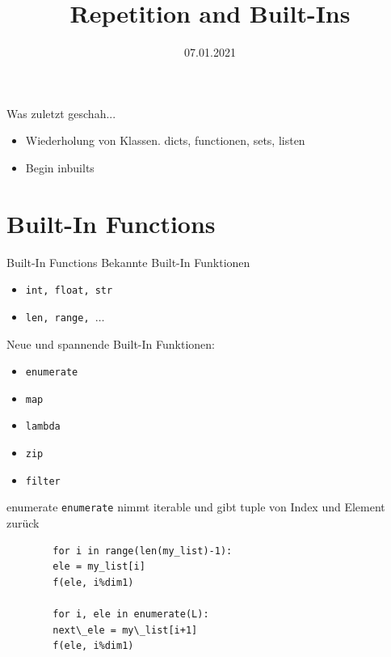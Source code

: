 



\title{Repetition and Built-Ins}
\date{07.01.2021}


	
\maketitle

\begin{frame}{Was zuletzt geschah...}
	\begin{itemize}
		\item Wiederholung von Klassen. dicts, functionen, sets, listen
		\item Begin inbuilts
	\end{itemize}
\end{frame}

\section{Built-In Functions}
\begin{frame}{Built-In Functions}
	Bekannte Built-In Funktionen
	\begin{itemize}
		\item \texttt{int, float, str}
		\item \texttt{len, range, $\dots$}
	\end{itemize}
	\pause
	Neue und spannende Built-In Funktionen:
	\begin{itemize}
		\item \texttt{enumerate}
		\item \texttt{map}
		\item \texttt{lambda}
		\item \texttt{zip}
		\item \texttt{filter}
	\end{itemize}
\end{frame}

\begin{frame}[fragile]{enumerate}
	\texttt{enumerate} nimmt iterable und gibt tuple von Index und Element zurück
	\begin{lstlisting}
		for i in range(len(my_list)-1):
		ele = my_list[i]
		f(ele, i%dim1)
		
		for i, ele in enumerate(L):
		next\_ele = my\_list[i+1]
		f(ele, i%dim1)
	\end{lstlisting}
\end{frame}

